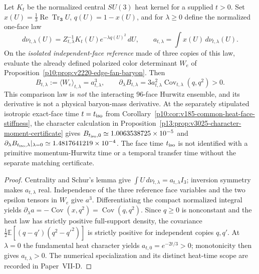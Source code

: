 \documentclass[12pt,a4paper]{article}
\begin{document}
\begin{proposition}
\label{p10:prop:v3025-threeface-action-sensitivity}
Let $K_t$ be the normalized central $SU(3)$ heat kernel for a supplied
$t>0$.  Set $x(U)=\frac13\operatorname{Re}\operatorname{Tr}_{\mathbf3}U$,
$q(U)=1-x(U)$, and for $\lambda\ge0$ define the normalized one-face law
\[
 d\nu_{t,\lambda}(U)=Z_{t,\lambda}^{-1}
 K_t(U)e^{-\lambda q(U)^2}\,dU,\qquad
 a_{t,\lambda}=\int x(U)\,d\nu_{t,\lambda}(U).
\]
On the \emph{isolated independent-face reference} made of three copies
of this law, evaluate the already defined polarized color determinant
$W_e$ of Proposition~\ref{p10:prop:v2220-edge-fan-baryon}.  Then
\[
 \boxed{B_{t,\lambda}:=\langle W_e\rangle_{t,\lambda}
 =a_{t,\lambda}^{3},\qquad
 \partial_\lambda B_{t,\lambda}
 =3a_{t,\lambda}^2\operatorname{Cov}_{t,\lambda}(q,q^2)>0.}
\]
This comparison law is \emph{not} the interacting 96-face Hurwitz
ensemble, and its derivative is not a physical baryon-mass derivative.
At the separately stipulated isotropic exact-face time $t=t_{\rm iso}$
from Corollary~\ref{p10:cor:v185-common-heat-face-stiffness}, the
character calculation in
Proposition~\ref{p13:prop:v3025-character-moment-certificate} gives
$B_{t_{\rm iso},0}\simeq1.0063538725\times10^{-5}$ and
$\partial_\lambda B_{t_{\rm iso},\lambda}|_{\lambda=0}
\simeq1.4817641219\times10^{-4}$.  The face time $t_{\rm iso}$ is
not identified with a primitive momentum-Hurwitz time or a temporal
transfer time without the separate matching certificate.
\end{proposition}
\begin{proof}
Centrality and Schur's lemma give
$\int U\,d\nu_{t,\lambda}=a_{t,\lambda}I_3$; inversion symmetry
makes $a_{t,\lambda}$ real.  Independence of the three reference
face variables and the two epsilon tensors in $W_e$ give $a^3$.
Differentiating the compact normalized integral yields
$\partial_\lambda a=-\operatorname{Cov}(x,q^2)
=\operatorname{Cov}(q,q^2)$.  Since $q\ge0$ is nonconstant and the heat
law has strictly positive full-support density, the covariance
$\frac12\mathbb E[(q-q')(q^2-q'^2)]$ is strictly positive for
independent copies $q,q'$.  At $\lambda=0$ the fundamental heat
character yields $a_{t,0}=e^{-2t/3}>0$; monotonicity then gives
$a_{t,\lambda}>0$.  The numerical specialization and its distinct
heat-time scope are recorded in Paper~VII-D.
\end{proof}
\end{document}
